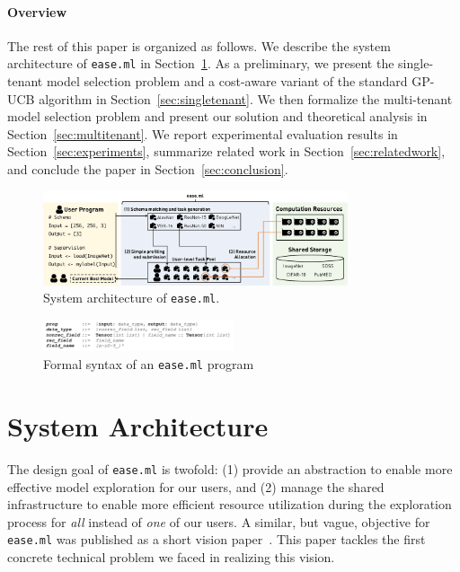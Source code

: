 \documentclass[letterpaper]{vldb}
\newcommand{\eml}{\texttt{ease.ml}\xspace}
\begin{document}
\vspace{-0.75em}
\paragraph*{Overview}
The rest of this paper is organized as follows.
We describe the system architecture of \eml in Section~\ref{sec:architecture}.
As a preliminary, we present the single-tenant model selection problem and a cost-aware variant of the standard GP-UCB algorithm in Section~\ref{sec:singletenant}.
We then formalize the multi-tenant model selection problem and present our solution and theoretical analysis in Section~\ref{sec:multitenant}.
We report experimental evaluation results in Section~\ref{sec:experiments}, summarize related work in Section~\ref{sec:relatedwork}, and conclude the paper in Section~\ref{sec:conclusion}.


\begin{figure}
\centering
\includegraphics[width=0.8\textwidth]{figures/easeml}
\vspace{-1em}
\caption{System architecture of \texttt{ease.ml}.}
\label{fig:architecture}
\vspace{-1em}
\end{figure}


\begin{figure}[t]
\centering
\includegraphics[width=0.5\textwidth]{figures/syntax}
\vspace{-2em}
\caption{Formal syntax of an \eml program}
\label{fig:syntax}
\vspace{-1em}
\end{figure}


\newpage
\vspace{-1em}
\section{System Architecture} \label{sec:architecture}

The design goal of \eml is twofold: (1) provide an abstraction
to enable more effective model exploration for our users, and 
(2) manage the shared infrastructure to enable more efficient
resource utilization during the exploration process 
for {\em all} instead of {\em one} of our users.
A similar, but vague, objective for \eml was published as a short vision paper~\cite{Zhang2017a}. This paper tackles the first
concrete technical problem we faced in realizing this
vision.
\end{document}
